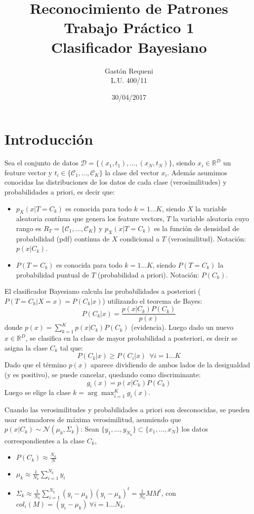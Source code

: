 \documentclass[a4paper,11pt]{article}
\author{Gastón Requeni\\ L.U. 400/11}
\title{Reconocimiento de Patrones\\ Trabajo Práctico 1\\ Clasificador Bayesiano}
\date{30/04/2017}
\newcommand{\real}{\mathds{R}}
\begin{document}
\maketitle

\section{Introducción}
Sea el conjunto de datos $\mathcal{D} = \{(x_1,t_1), \dots, (x_N,t_N)\}$, siendo $x_i\in\real^D$ un feature vector y $t_i\in \{\mathcal{C}_1, \dots, \mathcal{C}_K\}$ la clase del vector $x_i$. Además asumimos conocidas las distribuciones de los datos de cada clase (verosimilitudes) y probabilidades a priori, es decir que:
\begin{itemize}
  \item $p_X(x|T = C_k)$ es conocida para todo $k=1\dots K$, siendo $X$ la variable aleatoria contínua que genera los feature vectors, $T$ la variable aleatoria cuyo rango es $R_T = \{\mathcal{C}_1, \dots, \mathcal{C}_K\}$ y $p_X(x|T = C_k)$ es la función de densidad de probabilidad (pdf) contínua de $X$ condicional a $T$ (verosimilitud). Notación: $p(x|C_k)$.
  \item $P(T=C_k)$ es conocida para todo $k=1\dots K$, siendo $P(T=C_k)$ la probabilidad puntual de $T$ (probabilidad a priori). Notación: $P(C_k)$.
\end{itemize}

El clasificador Bayesiano calcula las probabilidades a posteriori ($P(T=C_k|X=x) = P(C_k|x)$) utilizando el teorema de Bayes:
$$P(C_k|x) = \frac{p(x|C_k) P(C_k)}{p(x)}$$
donde $p(x)=\sum_{k=1}^{K} p(x|C_k)P(C_k)$ (evidencia).
Luego dado un nuevo $x\in\real^D$, se clasifica en la clase de mayor probabilidad a posteriori, es decir se asigna la clase $C_k$ tal que:
$$ P(C_k|x) \geq P(C_i|x) \ \ \forall i=1\dots K$$
Dado que el término $p(x)$ aparece dividiendo de ambos lados de la desigualdad (y es positivo), se puede cancelar, quedando como discriminante:
$$g_i(x) = p(x|C_k) P(C_k)$$
Luego se elige la clase $k = \arg \max_{i=1}^{K} g_i(x)$.

Cuando las verosimilitudes y probabilidades a priori son desconocidas, se pueden usar estimadores de máxima verosimilitud, asumiendo que $p(x|C_k)\sim\mathcal{N}(\mu_k, \Sigma_k)$: Sean $\{y_1,\dots, y_{N_k}\} \subset \{x_1,\dots, x_N\}$ los datos correspondientes a la clase $C_k$,
\begin{itemize}
  \item $P(C_k) \approx \frac{N_k}{N}$
  \item $\mu_k \approx \frac{1}{N_k} \sum_{i=1}^{N_k} y_i$
  \item $\Sigma_k \approx \frac{1}{N_k} \sum_{i=1}^{N_k} (y_i - \mu_k)(y_i - \mu_k)^t = \frac{1}{N_k} MM^t$, con
  $col_i(M) = (y_i - \mu_k) \ \forall i=1\dots N_k$. 
\end{itemize}
\end{document}
